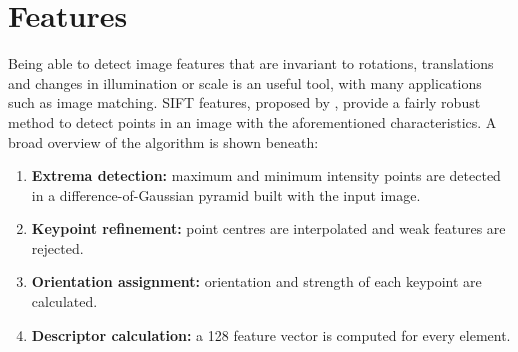 \documentclass[12pt]{article}
\begin{document}
\section{Features}

Being able to detect image features that are invariant to rotations, translations and changes in illumination or scale is an useful tool, with many applications such as image matching.
SIFT features, proposed by \cite{Lowe2004}, provide a fairly robust method to detect points in an image with the aforementioned characteristics.
A broad overview of the algorithm is shown beneath:
\begin{enumerate}
\item \textbf{Extrema detection:} maximum and minimum intensity points are detected in a difference-of-Gaussian pyramid built with the input image.
\item \textbf{Keypoint refinement:} point centres are interpolated and weak features are rejected.
\item \textbf{Orientation assignment:} orientation and strength of each keypoint are calculated.
\item \textbf{Descriptor calculation:} a 128 feature vector is computed for every element.
\end{enumerate}
\end{document}
